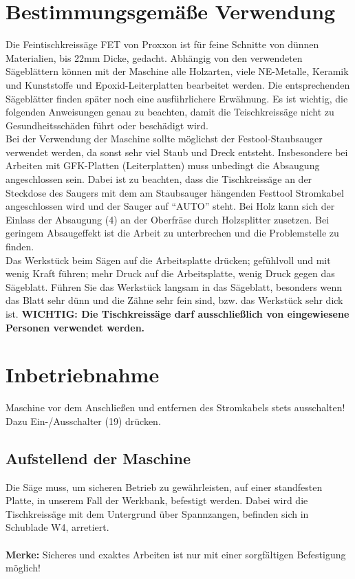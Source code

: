 \documentclass{\basedir/fablab-document}
\begin{document}
\section{Bestimmungsgemäße Verwendung}
Die Feintischkreissäge FET von Proxxon ist für feine Schnitte von dünnen Materialien, bis 22mm Dicke, gedacht. Abhängig von den verwendeten Sägeblättern können mit der Maschine alle Holzarten, viele NE-Metalle, Keramik und Kunststoffe und Epoxid-Leiterplatten bearbeitet werden. Die entsprechenden Sägeblätter finden später noch eine ausführlichere Erwähnung. Es ist wichtig, die folgenden Anweisungen genau zu beachten, damit die Teischkreissäge nicht zu Gesundheitsschäden führt oder beschädigt wird.\\
Bei der Verwendung der Maschine sollte möglichst der Festool-Staubsauger verwendet werden, da sonst sehr viel Staub und Dreck entsteht. Insbesondere bei Arbeiten mit GFK-Platten (Leiterplatten) muss unbedingt die Absaugung angeschlossen sein. Dabei ist zu beachten, dass die Tischkreissäge an der Steckdose des Saugers mit dem am Staubsauger hängenden Festtool Stromkabel angeschlossen wird und der Sauger auf \enquote{AUTO} steht. Bei Holz kann sich der Einlass der Absaugung (4) an der Oberfräse durch Holzsplitter zusetzen. Bei geringem Absaugeffekt ist die Arbeit zu unterbrechen und die Problemstelle zu finden.\\
Das Werkstück beim Sägen auf die Arbeitsplatte drücken; gefühlvoll und mit wenig Kraft führen; mehr Druck auf die Arbeitsplatte, wenig Druck gegen das Sägeblatt. Führen Sie das Werkstück langsam in das Sägeblatt, besonders wenn das Blatt sehr dünn und die Zähne sehr fein sind, bzw. das Werkstück sehr dick ist.
\textbf{WICHTIG: Die Tischkreissäge darf ausschließlich von eingewiesene Personen verwendet werden.}


\section{Inbetriebnahme}
Maschine vor dem Anschließen und entfernen des Stromkabels stets ausschalten! Dazu Ein-/Ausschalter (19) drücken.

\subsection{Aufstellend der Maschine}
Die Säge muss, um sicheren Betrieb zu gewährleisten, auf einer standfesten Platte, in unserem Fall der Werkbank, befestigt werden. Dabei wird die Tischkreissäge mit dem Untergrund über Spannzangen, befinden sich in Schublade W4, arretiert. \\ \\
\textbf{Merke:}
Sicheres und exaktes Arbeiten ist nur mit einer sorgfältigen Befestigung möglich!
\end{document}
